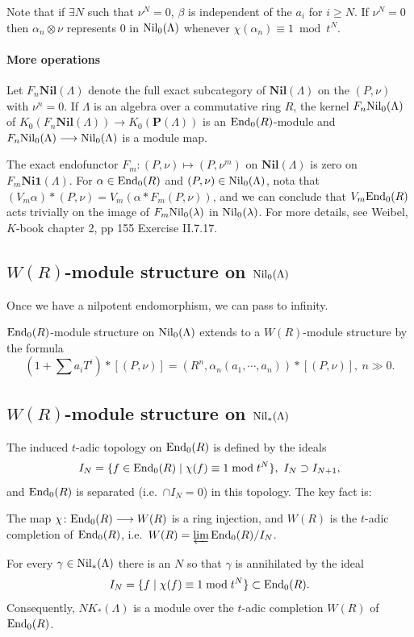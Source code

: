 Note that if $\exists N$ such that $\nu^N=0$, $\beta$ is independent of the $a_i$ for $i\geq N$. If $\nu^N =0$ then $\alpha_n \otimes \nu$ represents $0$ in $\mathrm{Nil}_0(\Lambda)$ whenever $\chi(\alpha_n)\equiv 1 \bmod t^N$.

\paragraph{More operations} 
Let $F_n\mathbf{Nil}(\Lambda)$ denote the full exact subcategory of $\mathbf{Nil}(\Lambda)$ on the $(P, \nu)$ with $\nu^n = 0$. If $\Lambda$ is an algebra over a commutative
ring $R$, the kernel $F_n\mathrm{Nil}_0(\Lambda)$ of $K_0 (F_n\mathbf{Nil}(\Lambda)) \longrightarrow  K_0 (\mathbf{P}(\Lambda))$ is an $\mathrm{End}_0(R)$-module and $F_n\mathrm{Nil}_0(\Lambda)\longrightarrow \mathrm{Nil}_0(\Lambda)$ is a module map.

The exact endofunctor $F_m \colon (P, \nu)\mapsto  (P, \nu^m)$ on $\mathbf{Nil}(\Lambda)$ is zero on $F_m\mathbf{Ni1}(\Lambda)$. For $\alpha \in \mathrm{End}_0(R)$ and $(P, \nu) \in \mathrm{Nil}_0(\Lambda)$, nota that $(V_m \alpha)*(P, \nu) =
V_m (\alpha *F_m (P, \nu))$, and we can conclude that $V_m \mathrm{End}_0(R)$ acts trivially on the image of $F_m \mathrm{Nil}_0(\lambda)$ in $\mathrm{Nil}_0(\lambda)$. For more details, see Weibel, $K$-book chapter 2, pp 155 Exercise II.7.17.




%
%
\subsection{$W(R)$-module structure on $\mathrm{Nil}_0(\Lambda)$}
Once we have a nilpotent endomorphism, we can pass to infinity.
\begin{theorem}
	$\mathrm{End}_0(R)$-module structure on $\mathrm{Nil}_0(\Lambda)$ extends to a $W(R)$-module structure by the formula
	\[(1+\sum a_iT^i)*[(P,\nu)]=(R^n,\alpha_n(a_1,\cdots,a_n))*[(P,\nu)], \ n \gg 0.\]
\end{theorem}

% 
%
\subsection{$W(R)$-module structure on $\mathrm{Nil}_*(\Lambda)$}
The induced $t$-adic topology on $\mathrm{End}_0(R)$ is defined by the ideals 
\[I_N = \{f \in \mathrm{End}_0(R) \mid \chi(f) \equiv 1\bmod t^N\}, \ I_N\supset I_{N+1},\] 
and $\mathrm{End}_0 (R)$ is separated (i.e.\ $\cap I_N =0$) in this topology.  The key fact is:
\begin{theorem}[Almkvist]
	The map $\chi \colon \mathrm{End}_0 (R) \longrightarrow W(R)$ is a ring injection, and $W(R)$ is the $t$-adic completion of $\mathrm{End}_0 (R)$, i.e.\ $W(R)=\varprojlim \mathrm{End}_0(R)/I_N$.
\end{theorem}
\begin{theorem}[Stienstra]
	For every $\gamma \in \mathrm{Nil}_*(\Lambda)$ there is an  $N$ so that $\gamma$ is annihilated by the ideal
\[I_N = \{f \mid \chi(f)\equiv 1\bmod t^N\} \subset \mathrm{End}_0 (R).\]
Consequently, $NK_*(\Lambda)$ is a module over the $t$-adic completion $W(R)$ of $\mathrm{End}_0(R)$.
\end{theorem}

